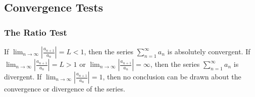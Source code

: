 \subsection{Convergence Tests}
\subsubsection*{The Ratio Test}
\begin{theorem}
    If
    \(\displaystyle{\lim_{n\to\infty}\left|\frac{a_{n+1}}{a_n}\right|=L<1}\),
    then the series \(\sum_{n=1}^\infty a_n\) is absolutely convergent.
    If
    \(\displaystyle{\lim_{n\to\infty}\left|\frac{a_{n+1}}{a_n}\right|=L>1}\)
    or
    \(\displaystyle{\lim_{n\to\infty}\left|\frac{a_{n+1}}{a_n}\right|
    =\infty}\),
    then the series \(\sum_{n=1}^\infty a_n\) is divergent.
    If
    \(\displaystyle{\lim_{n\to\infty}\left|\frac{a_{n+1}}{a_n}\right|=1}\),
    then no conclusion can be drawn about the convergence or divergence of the
    series.
\end{theorem}